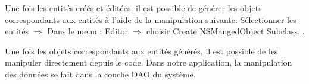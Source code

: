 	Une fois les entités créés et éditées, il est possible de générer les objets correspondants aux entités à l'aide de la manipulation suivante: Sélectionner les entités   \begin{math} \Rightarrow \end{math} Dans le menu : Editor  \begin{math} \Rightarrow \end{math}  choisir Create NSMangedObject Subclass... 
	
	Une fois les objets correspondants aux entités générés, il est possible de les manipuler directement depuis le code. Dans notre application, la manipulation des données se fait dans la couche DAO du système.
	
\lstset{
	style = Xcode,
	caption=Exemple de création de lecture et de suppression de données dans la base à l'aide de Core Data .,
	breaklines=true,
	frame=single
}

